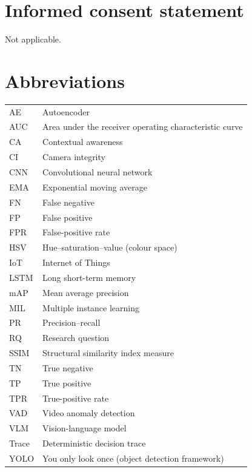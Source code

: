 \documentclass[a4paper,fleqn]{cas-dc}
\begin{document}
\section*{Informed consent statement}

Not applicable.

\section*{Abbreviations}

\begin{tabularx}{\linewidth}{@{}p{1.45cm}>{\raggedright\arraybackslash}X@{}}
AE    & Autoencoder \\
AUC   & Area under the receiver operating characteristic curve \\
CA    & Contextual awareness \\
CI    & Camera integrity \\
CNN   & Convolutional neural network \\
EMA   & Exponential moving average \\
FN    & False negative \\
FP    & False positive \\
FPR   & False-positive rate \\
HSV   & Hue--saturation--value (colour space) \\
IoT   & Internet of Things \\
LSTM  & Long short-term memory \\
mAP   & Mean average precision \\
MIL   & Multiple instance learning \\
PR    & Precision--recall \\
RQ    & Research question \\
SSIM  & Structural similarity index measure \\
TN    & True negative \\
TP    & True positive \\
TPR   & True-positive rate \\
VAD   & Video anomaly detection \\
VLM   & Vision-language model \\
Trace & Deterministic decision trace \\
YOLO  & You only look once (object detection framework) \\
\end{tabularx}



\end{document}
